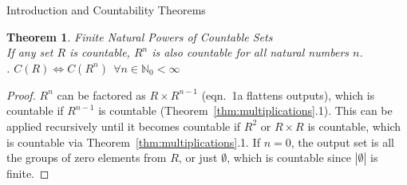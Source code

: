 \documentclass[12pt]{article}
\newtheorem{thm}{Theorem}
\begin{document}
\begin{section}{Introduction and Countability Theorems}
	\begin{thm}\label{thm:powers}
		\emph{
			Finite Natural Powers of Countable Sets\\
			\indent If any set $R$ is countable, $R^n$ is also countable for all natural
			numbers $n$.\vspace{0.4em}\\
			. $C(R)\iff C(R^n)~~\forall n\in\mathbb N_0<\infty$
		}
	\end{thm}\begin{proof}
		$R^n$ can be factored as $R\times R^{n-1}$ (eqn.~1a flattens outputs), which is countable if $R^{n-1}$ is countable (Theorem~\ref{thm:multiplications}.1). This can be applied recursively until it becomes countable if $R^2$ or $R\times R$ is
		countable, which is countable via Theorem~\ref{thm:multiplications}.1. If $n=0$, the
		output set is all the groups of zero elements from $R$, or just $\emptyset$, which is countable
		since $\left|\emptyset\right|$ is finite.
	\end{proof}


\end{section}
\end{document}
